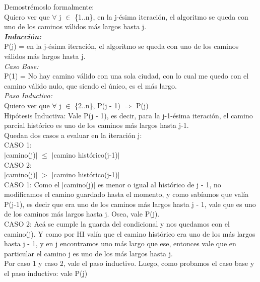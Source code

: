 \documentclass{article}
\theoremstyle{definition}
\theoremstyle{remark}
\begin{document}
Demostrémoslo formalmente: \\

Quiero ver que $\forall$ j $\in$ \{1..n\}, en la j-ésima iteración, el algoritmo se queda con uno de los caminos válidos más largos hasta j. \\

\textbf{\textit{Inducción: }} \\

P(j) = en la j-ésima iteración, el algoritmo se queda con uno de los caminos válidos más largos hasta j. \\

\textit{Caso Base:} \\
P(1) = No hay camino válido con una sola ciudad, con lo cual me quedo con el camino válido nulo, que siendo el único, es el más largo. \\

\textit{Paso Inductivo:} \\
Quiero ver que $\forall$ j $\in$ \{2..n\}, P(j - 1) $\Rightarrow$ P(j) \\
Hipótesis Inductiva: Vale P(j - 1), es decir, para la j-1-ésima iteración, el camino parcial histórico es uno de los caminos más largos hasta j-1. \\

Quedan dos casos a evaluar en la iteración j: \\
CASO 1: \\
$\vert$camino(j)$\vert$ $\leq$ $\vert$camino histórico(j-1)$\vert$ \\
CASO 2: \\
$\vert$camino(j)$\vert$ $>$ $\vert$camino histórico(j-1)$\vert$ \\

CASO 1:
Como el $\vert$camino(j)$\vert$ es menor o igual al histórico de j - 1, no modificamos el camino guardado hasta el momento, y como sabíamos que valía P(j-1), es decir que era uno de los caminos más largos hasta j - 1, vale que es uno de los caminos más largos hasta j. Osea, vale P(j). \\

CASO 2:
Acá se cumple la guarda del condicional y nos quedamos con el camino(j). Y como por HI valía que el camino histórico era uno de los más largos hasta j - 1, y en j encontramos uno más largo que ese, entonces vale que en particular el camino j es uno de los más largos hasta j. \\

Por caso 1 y caso 2, vale el paso inductivo. Luego, como probamos el caso base y el paso inductivo: vale P(j) \\
\end{document}
